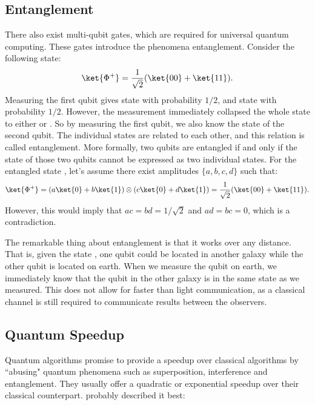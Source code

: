 \documentclass[a4paper,10pt]{article}
\begin{document}
\subsection{Entanglement} \label{sec:entanglement}
There also exist multi-qubit gates, which are required for universal quantum computing.
These gates introduce the phenomena entanglement.
Consider the following state:
\begin{equation}
\ket{\Phi^+} = \dfrac{1}{\sqrt2}(\ket{00} + \ket{11}).
\end{equation}
Measuring the first qubit gives state  with probability $1/2$, and state  with probability $1/2$.
However, the measurement immediately collapsed the whole state to either  or .
So by measuring the first qubit, we also know the state of the second qubit.
The individual states are related to each other, and this relation is called entanglement.
More formally, two qubits are entangled if and only if the state of those two qubits cannot be expressed as two individual states.
For the entangled state \ket{\Phi^+}, let's assume there exist amplitudes $\{a, b, c, d\}$ such that:
\begin{equation}
\ket{\Phi^+} = (a\ket{0} + b\ket{1}) \otimes (c\ket{0} + d\ket{1}) = \dfrac{1}{\sqrt2}(\ket{00} + \ket{11}).
\end{equation}
However, this would imply that $ac = bd = 1/\sqrt2$ and $ad = bc = 0$, which is a contradiction.

The remarkable thing about entanglement is that it works over any distance.
That is, given the state \ket{\Phi^+}, one qubit could be located in another galaxy while the other qubit is located on earth.
When we measure the qubit on earth, we immediately know that the qubit in the other galaxy is in the same state as we measured.
This does not allow for faster than light communication, as a classical channel is still required to communicate results between the observers.

\subsection{Quantum Speedup}
Quantum algorithms promise to provide a speedup over classical algorithms by ``abusing" quantum phenomena such as superposition, interference and entanglement.
They usually offer a quadratic or exponential speedup over their classical counterpart.
\cite{scott-aaronson-qc} probably described it best:
\end{document}
